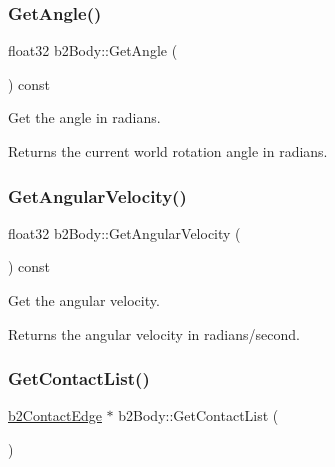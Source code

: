 \subsubsection{\texorpdfstring{Get\+Angle()}{GetAngle()}}
{\footnotesize\ttfamily float32 b2\+Body\+::\+Get\+Angle (\begin{DoxyParamCaption}{ }\end{DoxyParamCaption}) const\hspace{0.3cm}{\ttfamily [inline]}}

Get the angle in radians. \begin{DoxyReturn}{Returns}
the current world rotation angle in radians. 
\end{DoxyReturn}
\mbox{\label{classb2_body_a6a404d85efc510f43575f61cb95c07a7}} 
\subsubsection{\texorpdfstring{Get\+Angular\+Velocity()}{GetAngularVelocity()}}
{\footnotesize\ttfamily float32 b2\+Body\+::\+Get\+Angular\+Velocity (\begin{DoxyParamCaption}{ }\end{DoxyParamCaption}) const\hspace{0.3cm}{\ttfamily [inline]}}

Get the angular velocity. \begin{DoxyReturn}{Returns}
the angular velocity in radians/second. 
\end{DoxyReturn}
\mbox{\label{classb2_body_a16bdbfb266c82a0ef51be351a8928bc5}} 
\subsubsection{\texorpdfstring{Get\+Contact\+List()}{GetContactList()}}
{\footnotesize\ttfamily \hyperlink{structb2_contact_edge}{b2\+Contact\+Edge} $\ast$ b2\+Body\+::\+Get\+Contact\+List (\begin{DoxyParamCaption}{ }\end{DoxyParamCaption})\hspace{0.3cm}{\ttfamily [inline]}}

